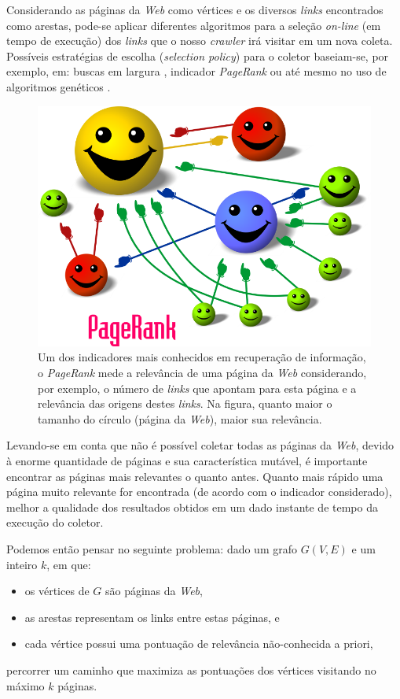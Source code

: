 \documentclass[a4paper,12pt,titlepage]{article}
\begin{document}
Considerando as páginas da \textit{Web} como vértices e os diversos \textit{links} encontrados como arestas, pode-se aplicar diferentes algoritmos para a seleção \textit{on-line} (em tempo de execução) dos \textit{links} que o nosso \textit{crawler} irá visitar em um nova coleta. Possíveis estratégias de escolha (\textit{selection policy}) para o coletor baseiam-se, por exemplo, em: buscas em largura \cite{najork}, indicador \textit{PageRank} \cite{cho} ou até mesmo no uso de algoritmos genéticos \cite{johnson}. 

\begin{figure}[H]
     \centering
     \includegraphics[scale=0.3]{figures/pagerank.png}
     \caption{Um dos indicadores mais conhecidos em recuperação de informação, o \textit{PageRank} mede a relevância de uma página da \textit{Web} considerando, por exemplo, o número de \textit{links} que apontam para esta página e a relevância das origens destes \textit{links}. Na figura, quanto maior o tamanho do círculo (página da \textit{Web}), maior sua relevância.}
     \label{bsp}
\end{figure}

Levando-se em conta que não é possível coletar todas as páginas da \textit{Web}, devido à enorme quantidade de páginas e sua característica mutável, é importante encontrar as páginas mais relevantes o quanto antes. Quanto mais rápido uma página muito relevante for encontrada (de acordo com o indicador considerado), melhor a qualidade dos resultados obtidos em um dado instante de tempo da execução do coletor.

Podemos então pensar no seguinte problema: dado um grafo $G(V,E)$ e um inteiro $k$, em que: 
\begin{itemize}[leftmargin=1.6cm]
    \item os vértices de $G$ são páginas da \textit{Web}, 
    \item as arestas representam os links entre estas páginas, e
    \item cada vértice possui uma pontuação de relevância não-conhecida a priori,
\end{itemize}
percorrer um caminho que maximiza as pontuações dos vértices visitando no máximo $k$ páginas. \\ 
\end{document}
